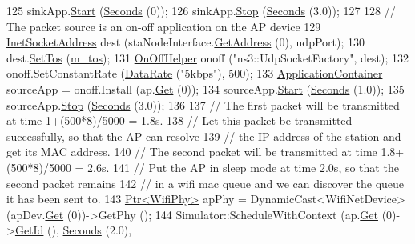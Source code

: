 \begin{DoxyCode}
125   sinkApp.\hyperlink{classns3_1_1ApplicationContainer_a8eff87926507020bbe3e1390358a54a7}{Start} (\hyperlink{group__timecivil_ga33c34b816f8ff6628e33d5c8e9713b9e}{Seconds} (0));
126   sinkApp.\hyperlink{classns3_1_1ApplicationContainer_adfc52f9aa4020c8714679b00bbb9ddb3}{Stop} (\hyperlink{group__timecivil_ga33c34b816f8ff6628e33d5c8e9713b9e}{Seconds} (3.0));
127 
128   \textcolor{comment}{// The packet source is an on-off application on the AP device}
129   \hyperlink{classns3_1_1InetSocketAddress}{InetSocketAddress} dest (staNodeInterface.\hyperlink{classns3_1_1Ipv4InterfaceContainer_ae63208dcd222be986822937ee4aa828c}{GetAddress} (0), udpPort);
130   dest.\hyperlink{classns3_1_1InetSocketAddress_a574001030dfb21d2963b2b4da081889d}{SetTos} (\hyperlink{classWifiAcMappingTest_a9e987a3d809f54cf531580fbad93e08c}{m\_tos});
131   \hyperlink{classns3_1_1OnOffHelper}{OnOffHelper} onoff (\textcolor{stringliteral}{"ns3::UdpSocketFactory"}, dest);
132   onoff.SetConstantRate (\hyperlink{classns3_1_1DataRate}{DataRate} (\textcolor{stringliteral}{"5kbps"}), 500);
133   \hyperlink{classns3_1_1ApplicationContainer}{ApplicationContainer} sourceApp = onoff.Install (ap.\hyperlink{classns3_1_1NodeContainer_a9ed96e2ecc22e0f5a3d4842eb9bf90bf}{Get} (0));
134   sourceApp.\hyperlink{classns3_1_1ApplicationContainer_a8eff87926507020bbe3e1390358a54a7}{Start} (\hyperlink{group__timecivil_ga33c34b816f8ff6628e33d5c8e9713b9e}{Seconds} (1.0));
135   sourceApp.\hyperlink{classns3_1_1ApplicationContainer_adfc52f9aa4020c8714679b00bbb9ddb3}{Stop} (\hyperlink{group__timecivil_ga33c34b816f8ff6628e33d5c8e9713b9e}{Seconds} (3.0));
136 
137   \textcolor{comment}{// The first packet will be transmitted at time 1+(500*8)/5000 = 1.8s.}
138   \textcolor{comment}{// Let this packet be transmitted successfully, so that the AP can resolve}
139   \textcolor{comment}{// the IP address of the station and get its MAC address.}
140   \textcolor{comment}{// The second packet will be transmitted at time 1.8+(500*8)/5000 = 2.6s.}
141   \textcolor{comment}{// Put the AP in sleep mode at time 2.0s, so that the second packet remains}
142   \textcolor{comment}{// in a wifi mac queue and we can discover the queue it has been sent to.}
143   \hyperlink{classns3_1_1Ptr}{Ptr<WifiPhy>} apPhy = DynamicCast<WifiNetDevice> (apDev.\hyperlink{classns3_1_1NetDeviceContainer_a677d62594b5c9d2dea155cc5045f4d0b}{Get} (0))->GetPhy ();
144   Simulator::ScheduleWithContext (ap.\hyperlink{classns3_1_1NodeContainer_a9ed96e2ecc22e0f5a3d4842eb9bf90bf}{Get} (0)->\hyperlink{classns3_1_1Node_aaf49b64a843565ce3812326313b370ac}{GetId} (), \hyperlink{group__timecivil_ga33c34b816f8ff6628e33d5c8e9713b9e}{Seconds} (2.0),

\end{DoxyCode}

